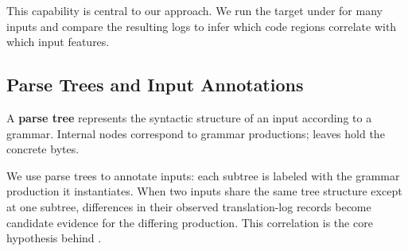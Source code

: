 This capability is central to our approach.
We run the target under \QEMU for many inputs and compare the resulting logs to infer which code regions correlate with which input features.

\subsection{Parse Trees and Input Annotations}\label{sec:bg:parsetrees}

A \textbf{parse tree} represents the syntactic structure of an input according to a grammar.
Internal nodes correspond to grammar productions; leaves hold the concrete bytes.

We use parse trees to annotate inputs: each subtree is labeled with the grammar production it instantiates.
When two inputs share the same tree structure except at one subtree, differences in their observed translation-log records become candidate evidence for the differing production.
This correlation is the core hypothesis behind \toolname.
